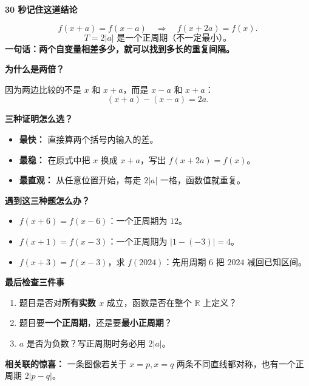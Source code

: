 \clearpage
\begin{summarybox}
\textbf{\textcolor{CSummary}{30 秒记住这道结论}}

\[
\boxed{f(x+a)=f(x-a)\quad\Longrightarrow\quad f(x+2a)=f(x).}
\]
\[
\boxed{T=2|a|\text{ 是一个正周期（不一定最小）。}}
\]
\textbf{一句话：两个自变量相差多少，就可以找到多长的重复间隔。}

\medskip
\textbf{\textcolor{CSummary}{为什么是两倍？}}

因为两边比较的不是 $x$ 和 $x+a$，而是 $x-a$ 和 $x+a$：
\[
(x+a)-(x-a)=2a.
\]

\medskip
\textbf{\textcolor{CSummary}{三种证明怎么选？}}
\begin{itemize}[leftmargin=*,itemsep=.28em]
\item \textbf{最快：} 直接算两个括号内输入的差。
\item \textbf{最稳：} 在原式中把 $x$ 换成 $x+a$，写出 $f(x+2a)=f(x)$。
\item \textbf{最直观：} 从任意位置开始，每走 $2|a|$ 一格，函数值就重复。
\end{itemize}

\medskip
\textbf{\textcolor{CSummary}{遇到这三种题怎么办？}}
\begin{itemize}[leftmargin=*,itemsep=.28em]
\item $f(x+6)=f(x-6)$：一个正周期为 $12$。
\item $f(x+1)=f(x-3)$：一个正周期为 $|1-(-3)|=4$。
\item $f(x+3)=f(x-3)$，求 $f(2024)$：先用周期 $6$ 把 $2024$ 减回已知区间。
\end{itemize}

\medskip
\textbf{\textcolor{CSummary}{最后检查三件事}}
\begin{enumerate}[leftmargin=*,itemsep=.25em]
\item 题目是否对\textbf{所有实数 $x$} 成立，函数是否在整个 $\mathbb R$ 上定义？
\item 题目要\textbf{一个正周期}，还是要\textbf{最小正周期}？
\item $a$ 是否为负数？写正周期时务必用 $2|a|$。
\end{enumerate}

\textbf{相关联的惊喜：} 一条图像若关于 $x=p,x=q$ 两条不同直线都对称，也有一个正周期 $2|p-q|$。
\end{summarybox}
